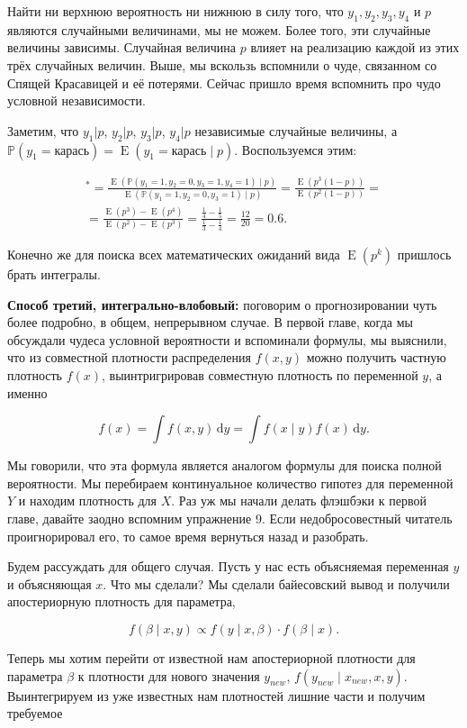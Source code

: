 \documentclass[12pt, a4paper, oneside]{extreport}
\DeclareMathOperator{\E}{\mathop{E}}
\def \b{\beta}
\def \mbb{\mathbb}
\def \PP{\mbb{P}}
\newcommand{\dx}[1]{\,\mathrm{d}#1} %
\theoremstyle{plain}              %
\theoremstyle{definition}         %
\begin{document}
Найти ни верхнюю вероятность ни нижнюю в силу того, что $y_1, y_2, y_3,y_4$ и $p$ являются случайными величинами, мы не можем. Более того, эти случайные величины зависимы. Случайная величина $p$ влияет на реализацию каждой из этих трёх случайных величин. Выше, мы вскользь вспомнили о чуде, связанном со Спящей Красавицей и её потерями. Сейчас пришло время вспомнить про чудо условной независимости. 

Заметим, что $y_1|p$,  $y_2|p$, $y_3|p$, $y_4|p$ независимые случайные величины, а $\PP(y_1 = \text{карась}) = \E(y_1 = \text{карась} \mid p)$. Воспользуемся этим:

\begin{multline*}
 ^* =  \frac{ \E(\PP(y_1 = 1,y_2 = 0,y_3 = 1,y_4=1) \mid p)}{\E(\PP(y_1 = 1,y_2 = 0,y_3=1)\mid p)} =  \frac{\E(p^3(1-p))}{\E(p^2(1-p))} = \\ =  \frac{\E(p^3) - \E(p^4)}{\E(p^2) - \E(p^3)} =  \frac{\frac{1}{4} - \frac{1}{5}}{\frac{1}{3} - \frac{1}{4}} = \frac{12}{20} = 0.6.
 \end{multline*}

Конечно же для поиска всех математических ожиданий вида $\E(p^k)$ пришлось брать интегралы.

\textbf{Способ третий, интегрально-влобовый:} поговорим о прогнозировании чуть более подробно, в общем, непрерывном случае. В первой главе, когда мы обсуждали чудеса условной вероятности и вспоминали формулы, мы выяснили, что из совместной плотности распределения $f(x,y)$ можно получить частную плотность $f(x)$, выинтригрировав совместную плотность по переменной $y$, а именно 

\[ f(x) = \int f(x,y) \dx{y} = \int f(x \mid y) f(x) \dx{y}.\]  

Мы говорили, что эта формула является аналогом формулы для поиска полной вероятности. Мы перебираем континуальное количество гипотез для переменной $Y$ и находим плотность для $X$.  Раз уж мы начали делать флэшбэки к первой главе, давайте заодно вспомним упражнение 9. Если недобросовестный читатель проигнорировал его, то самое время вернуться назад и разобрать. 

 Будем рассуждать для общего случая. Пусть у нас есть объясняемая переменная $y$ и объясняющая $x$. Что мы сделали? Мы сделали байесовский вывод и получили апостериорную плотность для параметра, 

\[ f(\b \mid x, y) \propto f(y \mid x, \b) \cdot f(\b \mid x).\]

Теперь мы хотим перейти от известной нам апостериорной плотности для параметра $\b$ к плотности для нового значения $y_{new}$, $f(y_{new} \mid x_{new},x,y)$. Выинтегрируем из уже известных нам плотностей лишние части и получим требуемое
\end{document}
